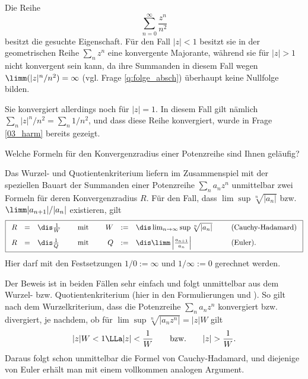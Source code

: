 \begin{antwort}
  Die Reihe 
  \[
  \sum_{n=0}^\infty \frac{z^n}{n^2}
  \] 
  besitzt die 
  gesuchte Eigenschaft. Für den Fall $|z| < 1$ besitzt sie in 
  der geometrischen Reihe 
  $\sum_n z^n$ eine konvergente Majorante, während sie für $|z|>1$ 
  nicht konvergent sein kann, da ihre Summanden in diesem Fall 
  wegen $\limm (|z|^n/n^2) = \infty$ (vgl. Frage 
  \ref{q:folge_absch}) überhaupt keine Nullfolge bilden. 

  Sie konvergiert allerdings noch für $|z|=1$. 
  In diesem Fall gilt nämlich  
  $\sum_n |z|^n / n^2=\sum_n 1/n^2$, und dass diese Reihe konvergiert, 
  wurde in Frage \ref{03_harm} bereits gezeigt.
  \AntEnd
\end{antwort}

\begin{frage}\label{02_kokf}
  Welche Formeln für den Konvergenzradius einer Potenzreihe sind Ihnen geläufig?
\end{frage}

\begin{antwort}
  Das Wurzel- und Quotientenkriterium liefern 
  im Zusammenspiel mit der speziellen Bauart der 
  Summanden einer Potenzreihe $\sum_n a_n z^n$  
  unmittelbar zwei Formeln für deren Konvergenzradius $R$. 
  Für den Fall, dass $\lim \sup \sqrt[n]{|a_n|}$ bzw. 
  $\limm |a_{n+1}|/|a_n|$ existieren, gilt 
  \[\boxed{
    \begin{array}{rclp{1mm}cp{1mm}rclp{2mm}l}
      R  &=& \dis \frac{1}{W} & & \text{mit} & & 
      W  &:=& \dis \lim_{n\to\infty} 
      \sup \sqrt[n]{|a_n|} & & \text{(Cauchy-Hadamard)}\\[2mm]
      R  &=& \dis \frac{1}{Q} & & \text{mit} & & 
      Q  &:=& \dis \limm \left| \frac{a_{n+1}}{a_n}\right|
      & & \text{(Euler).}
    \end{array}}
  \]
  Hier darf mit den Festsetzungen 
  $1/0 := \infty$ und $1/\infty :=0$ gerechnet werden.  
  
  Der Beweis ist in beiden Fällen sehr einfach und folgt unmittelbar 
  aus dem Wurzel- bzw. Quotientenkriterium (hier in den 
  Formulierungen  und ). So gilt nach dem Wurzelkriterium, 
  dass die Potenzreihe $\sum_n a_n z^n$ konvergiert bzw. divergiert, je 
  nachdem, ob für $\lim\sup\sqrt[n]{|a_n z^n|}=|z| W$ gilt
  \[
  |z| W < 1 \LLa |z| < \frac{1}{W} \qquad\text{bzw.}\qquad 
  |z| > \frac{1}{W}. 
  \]
  Daraus folgt schon unmittelbar die Formel von Cauchy-Hadamard, und diejenige 
  von Euler erhält man mit einem vollkommen analogen Argument.   
  \AntEnd
\end{antwort}

